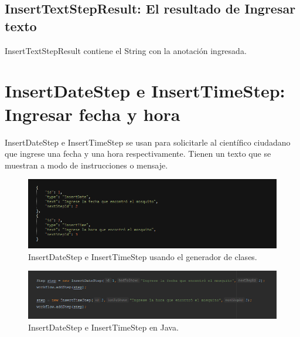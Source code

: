 \subsection{InsertTextStepResult: El resultado de Ingresar texto}
InsertTextStepResult contiene el String con la anotación ingresada.





\section{InsertDateStep e InsertTimeStep: Ingresar fecha y hora}
InsertDateStep e InsertTimeStep se usan para solicitarle al científico ciudadano que ingrese una fecha y una hora respectivamente. Tienen un texto que se muestran a modo de instrucciones o mensaje.


\begin{figure}[H]
  \centering
    \includegraphics[scale=0.6]{50-anexos/C-steps/insert_date_time_json.png} 
    \caption{InsertDateStep e InsertTimeStep usando el generador de clases.}
\end{figure}	

\begin{figure}[H]
  \centering
    \includegraphics[scale=0.6]{50-anexos/C-steps/insert_date_time_java.png} 
    \caption{InsertDateStep e InsertTimeStep en Java.}
\end{figure}

